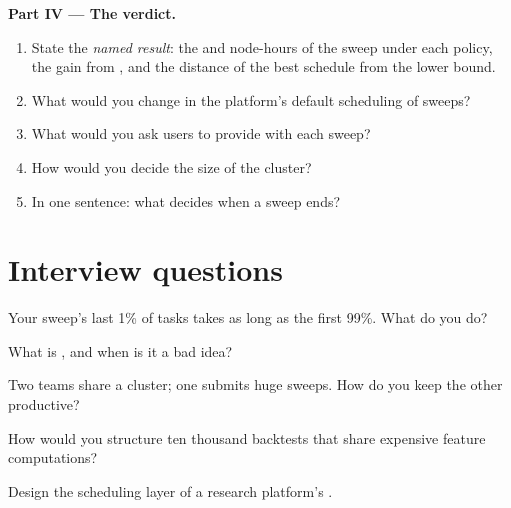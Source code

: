 \begin{problem}
\medskip\noindent\textbf{Part IV --- The verdict.}
\begin{enumerate}[resume]
\item State the \emph{named result}: the  and node-hours of the sweep under each policy, the gain from , and
the distance of the best schedule from the lower bound.
\item What would you change in the platform's default scheduling of sweeps?
\item What would you ask users to provide with each sweep?
\item How would you decide the size of the cluster?
\item In one sentence: what decides when a sweep ends?
\end{enumerate}
\end{problem}

\section{Interview questions}

\begin{interviewq}\label{iq:pl:distributed-compute-and-schedulers:1}
Your sweep's last 1\% of tasks takes as long as the first 99\%. What do you do?
\end{interviewq}

\begin{interviewq}\label{iq:pl:distributed-compute-and-schedulers:2}
What is , and when is it a bad idea?
\end{interviewq}

\begin{interviewq}\label{iq:pl:distributed-compute-and-schedulers:3}
Two teams share a cluster; one submits huge sweeps. How do you keep the other productive?
\end{interviewq}

\begin{interviewq}\label{iq:pl:distributed-compute-and-schedulers:4}
How would you structure ten thousand backtests that share expensive feature computations?
\end{interviewq}

\begin{interviewq}\label{iq:pl:distributed-compute-and-schedulers:5}
Design the scheduling layer of a research platform's .
\end{interviewq}
